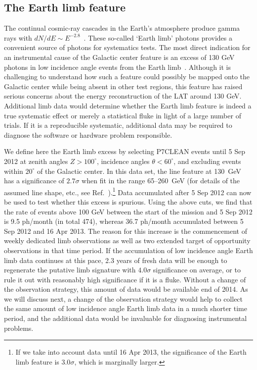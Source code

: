 \documentclass[aps,prd,superscriptaddress,nofootinbib,fixlfloat, 12pt]{revtex4-1}
\begin{document}
\subsection{The Earth limb feature}
The continual cosmic-ray cascades in the Earth's atmosphere produce gamma rays
with $dN/dE \sim E^{-2.8}$~\citep{FermiLimb}. 
These so-called `Earth limb' photons provides a convenient source of photons
for systematics tests. 
%
The most direct indication for an instrumental cause of the Galactic center
feature is an excess of 130 GeV photons in low incidence angle events from
the Earth limb~\cite{linepaper, finkbeiner_systematics, Hektor:2012ev,
bloom_charles_fermi_lat_line}. Although it is challenging to understand how
such a feature could possibly be mapped onto the Galactic center while being
absent in other test regions, this feature has raised serious concerns about the
energy reconstruction of the LAT around 130 GeV.  Additional limb data would
determine whether the Earth limb feature is indeed a true systematic effect or
merely a statistical fluke in light of a large number of trials.  If it is a
reproducible systematic, additional data may be required to diagnose the
software or hardware problem responsible. 

We define here the Earth limb excess by selecting P7CLEAN events until 5 Sep
2012 at zenith angles $Z>100^\circ$,
incidence angles $\theta<60^\circ$, and excluding events within $20^\circ$ of
the Galactic center. In this data set, the line feature at 130~GeV has a
significance of $2.7\sigma$ when
fit in the range 65--260~GeV (for details of the
assumed line shape, etc.,
see Ref.~\cite{finkbeiner_systematics}).\footnote{If we take into account data
  until 16 Apr 2013, the
significance of the Earth limb feature is $3.0\sigma$, which is marginally
larger.}
Data accumulated after 5 Sep 2012 can
now be used to test whether this excess is spurious. Using the above
cuts, we find that the rate of events above 100 GeV between the
start of the mission and 5 Sep 2012 is 9.5 ph/month (in total 474), whereas
36.7 ph/month accumulated between 5 Sep 2012 and 16 Apr 2013. The reason for
this increase is the commencement of weekly dedicated limb observations as
well as two extended
target of opportunity observations in that time period. If the accumulation of
low incidence angle Earth limb data continues at this pace, 2.3 years of fresh
data will be enough to regenerate the putative limb signature with $4.0\sigma$
significance on average, or to rule it out with reasonably high significance if it is a
fluke. Without a change of the observation strategy, this amount of data would
be available end of 2014. As we will discuss next, a change of the
observation strategy would help to collect the same amount of low incidence
angle Earth limb data in a much shorter time period, and the additional data
would be invaluable for diagnosing instrumental problems. 
\end{document}
